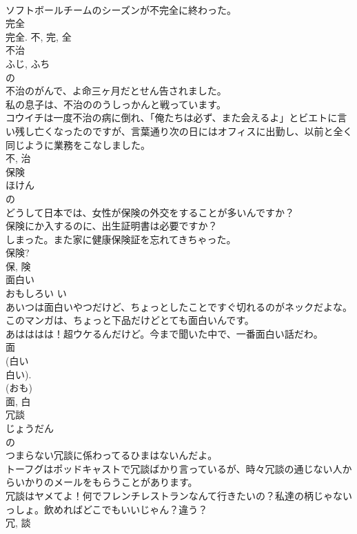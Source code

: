 \documentclass[8pt]{extreport}
\begin{document}
\begin{CJK}{UTF8}{min}
\\	ソフトボールチームのシーズンが不完全に終わった。	
\\	完全 
\\	完全.	不, 完, 全	
\\	不治	
\\	ふじ, ふち	
\\	の 
\\	不治のがんで、よ命三ヶ月だとせん告されました。	
\\	私の息子は、不治ののうしっかんと戦っています。	
\\	コウイチは一度不治の病に倒れ、「俺たちは必ず、また会えるよ」とビエトに言い残し亡くなったのですが、言葉通り次の日にはオフィスに出勤し、以前と全く同じように業務をこなしました。	
\\	不, 治	
\\	保険	
\\	ほけん	
\\	の 
\\	どうして日本では、女性が保険の外交をすることが多いんですか？	
\\	保険にか入するのに、出生証明書は必要ですか？	
\\	しまった。また家に健康保険証を忘れてきちゃった。	
\\	保険?	
\\	保, 険	
\\	面白い	
\\	おもしろい	い 
\\	あいつは面白いやつだけど、ちょっとしたことですぐ切れるのがネックだよな。	
\\	このマンガは、ちょっと下品だけどとても面白いんです。	
\\	あはははは！超ウケるんだけど。今まで聞いた中で、一番面白い話だわ。	
\\	面 
\\	(白い 
\\	白い). 
\\	(おも) 
\\	面, 白	
\\	冗談	
\\	じょうだん	
\\	の 
\\	つまらない冗談に係わってるひまはないんだよ。	
\\	トーフグはポッドキャストで冗談ばかり言っているが、時々冗談の通じない人からいかりのメールをもらうことがあります。	
\\	冗談はヤメてよ！何でフレンチレストランなんて行きたいの？私達の柄じゃないっしょ。飲めればどこでもいいじゃん？違う？	
\\	冗, 談	

\end{CJK}
\end{document}
